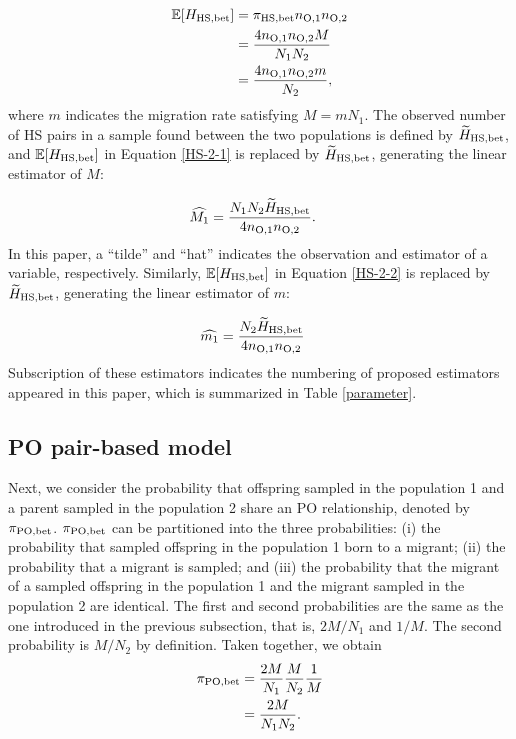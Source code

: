 \documentclass[12pt, English]{article}
\begin{document}
\begin{spacing}{1.9}
\begin{align}
\mathbb{E}[H_{\rm HS, bet}] &= \pi_{\rm HS,bet} n_{\rm O, 1} n_{\rm O, 2} \nonumber\\
&= \frac{ 4 n_{\rm O, 1} n_{\rm O, 2} M } { N_{1} N_{2} } \label{HS-2-1}\\
&= \frac{ 4 n_{\rm O, 1} n_{\rm O, 2} m } { N_{2} },
\label{HS-2-2}
\end{align}
where $m$ indicates the migration rate satisfying $M = mN_{1}$. The observed number of HS pairs in a sample found between the two populations is defined by $\widetilde{H}_{\rm HS, bet}$, and $\mathbb{E}[H_{\rm HS, bet}]$ in Equation \ref{HS-2-1} is replaced by $\widetilde{H}_{\rm HS, bet}$, generating the linear estimator of $M$:

\begin{align}
\widehat{M_1} &= \frac{N_{1} N_{2} \widetilde{H}_{\rm HS, bet} } {4 n_{\rm O, 1} n_{\rm O, 2} }.
\label{HS-3}
\end{align}
In this paper, a ``tilde'' and ``hat'' indicates the observation and estimator of a variable, respectively. Similarly, $\mathbb{E}[H_{\rm HS, bet}]$ in Equation \ref{HS-2-2} is replaced by $\widetilde{H}_{\rm HS, bet}$, generating the linear estimator of $m$:

\begin{align}
\widehat{m_1} &= \frac{N_{2} \widetilde{H}_{\rm HS, bet} } {4 n_{\rm O, 1} n_{\rm O, 2} }
\label{HS-4}
\end{align}
Subscription of these estimators indicates the numbering of proposed estimators appeared in this paper, which is summarized in Table \ref{parameter}. 

\begin{center}
\end{center}

\subsection{PO pair-based model}

Next, we consider the probability that offspring sampled in the population 1 and a parent sampled in the population 2 share an PO relationship, denoted by $\pi_{\rm PO, bet}$. $\pi_{\rm PO, bet}$ can be partitioned into the three probabilities: (i) the probability that sampled offspring in the population 1 born to a migrant; (ii) the probability that a migrant is sampled; and (iii) the probability that the migrant of a sampled offspring in the population 1 and the migrant sampled in the population 2 are identical. The first and second probabilities are the same as the one introduced in the previous subsection, that is, $2M/N_{1}$ and $1/M$. The second probability is $M/N_{2}$ by definition. Taken together, we obtain
\begin{align}
\pi_{\rm PO,bet} &= \frac{2M}{N_{1}} \frac{M}{N_{2}} \frac{1}{M} \nonumber\\
&= \frac{2M}{N_{1}N_{2}}.
\label{PO-1}
\end{align}


\end{spacing}
\end{document}
